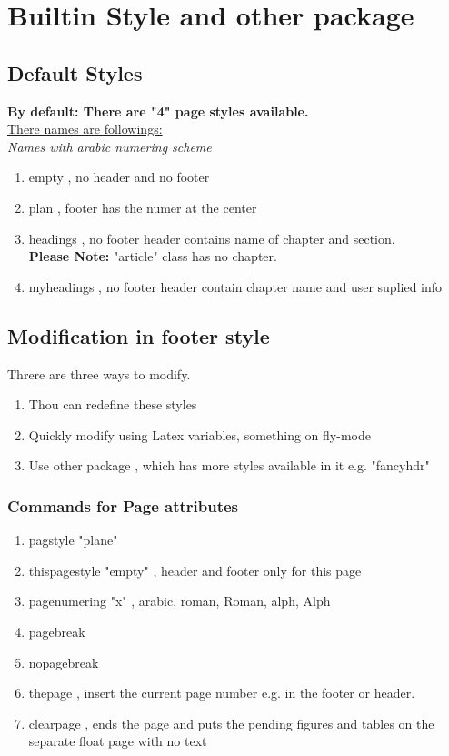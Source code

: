 \documentclass[a4paper,12pt]{book}
\begin{document}
	\chapter{Builtin Style and other package}
	\section{Default Styles}
	\textbf{By default: There are "4" page styles available.} \\
	\underline{There names are followings:} \\
	\textit{Names with arabic numering scheme} \\	
	\begin{enumerate}
		\item empty  , no header and no footer
		\item plan     , footer has the numer at the center 
		\item headings , no footer header contains name of chapter and section. \\
		\textbf{Please Note:} "article" class has no chapter.
		\item myheadings , no footer header contain chapter name and user suplied info 		
	\end{enumerate}

   \section{Modification in footer style}
   Threre are three ways to modify.
   \begin{enumerate}
   		\item Thou can redefine these styles
   		\item Quickly modify using Latex variables, something on fly-mode
   		\item Use other package , which has more styles available in it e.g. "fancyhdr"
   	\end{enumerate}	
   		\subsection{Commands for Page attributes}
   			\begin{enumerate}[label=\Roman*]
   				\item pagstyle "plane"
   				\item thispagestyle "empty" , header and footer only for this page
   				\item pagenumering "x" , arabic, roman, Roman, alph, Alph
   				\item pagebreak
   				\item nopagebreak
   				\item thepage , insert the current page number e.g. in the footer or header.
   				\item clearpage , ends the page and puts the pending figures and tables on the separate float page with no text
        	\end{enumerate}
   	
	
	
	
	
\end{document}
